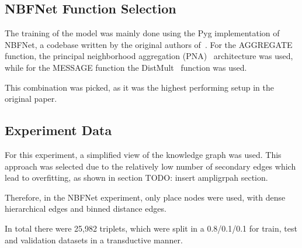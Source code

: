 \subsection{NBFNet Function Selection}

The training of the model was mainly done using the Pyg implementation of NBFNet, a codebase written by the original authors of~\cite{NBFNet_PyG}.
For the AGGREGATE function, the principal neighborhood aggregation (PNA)~\cite{PNA} architecture was used, while for the MESSAGE function the DistMult~\cite{DistMult} function
was used.

This combination was picked, as it was the highest performing setup in the original paper.

\subsection{Experiment Data}
For this experiment, a simplified view of the knowledge graph was used.
This approach was selected due to the relatively low number of secondary edges which lead to overfitting,
as shown in section TODO: insert ampligrpah section.

Therefore, in the NBFNet experiment, only place nodes were used, with dense hierarchical edges and binned distance
edges.

In total there were 25,982 triplets, which were split in a 0.8/0.1/0.1 for train, test and validation datasets
in a transductive manner.

